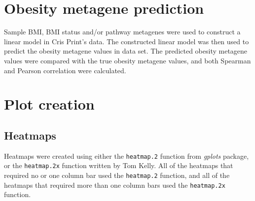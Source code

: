 \section{Obesity metagene prediction}
\label{sec:obesity_metagene_prediction}

Sample BMI, BMI status and/or pathway metagenes were used to construct a linear model in Cris Print's data.
The constructed linear model was then used to predict the obesity metagene values in \citet{Creighton2012} data set.
The predicted obesity metagene values were compared with the true obesity metagene values, and both Spearman and Pearson correlation were calculated.

\section{Plot creation}
\label{sec:plot_creation}

\subsection{Heatmaps}
\label{sub:heatmaps}

Heatmaps were created using either the \texttt{heatmap.2} function from \textit{gplots} package, or the \texttt{heatmap.2x} function written by Tom Kelly.
All of the heatmaps that required no or one column bar used the \texttt{heatmap.2} function, and all of the heatmaps that required more than one column bars used the \texttt{heatmap.2x} function.




